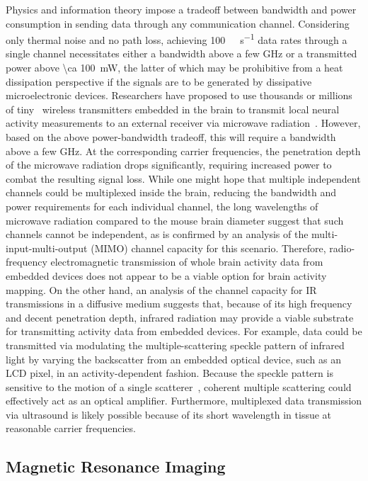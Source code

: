 Physics and information theory impose a tradeoff between bandwidth and power consumption in sending data through any communication channel.
Considering only thermal noise and no path loss, achieving \SI{100}{\giga\bit\per\second} data rates through a single channel necessitates either a bandwidth above a few \si{\giga\hertz} or a transmitted power above \SI{\ca 100}{\milli\watt}, the latter of which may be prohibitive from a heat dissipation perspective if the signals are to be generated by dissipative microelectronic devices.
Researchers have proposed to use thousands or millions of tiny~\cite{gomez10} wireless transmitters embedded in the brain to transmit local neural activity measurements to an external receiver via microwave radiation~\cite{dyson09}.
However, based on the above power-bandwidth tradeoff, this will require a bandwidth above a few \si{\giga\hertz}.
At the corresponding carrier frequencies, the penetration depth of the microwave radiation drops significantly, requiring increased power to combat the resulting signal loss.
While one might hope that multiple independent channels could be multiplexed inside the brain, reducing the bandwidth and power requirements for each individual channel, the long wavelengths of microwave radiation compared to the mouse brain diameter suggest that such channels cannot be independent, as is confirmed by an analysis of the multi-input-multi-output (MIMO) channel capacity for this scenario.
Therefore, radio-frequency electromagnetic transmission of whole brain activity data from embedded devices does not appear to be a viable option for brain activity mapping.
On the other hand, an analysis of the channel capacity for IR transmissions in a diffusive medium suggests that, because of its high frequency and decent penetration depth, infrared radiation may provide a viable substrate for transmitting activity data from embedded devices.
For example, data could be transmitted via modulating the multiple-scattering speckle pattern of infrared light by varying the backscatter from an embedded optical device, such as an LCD pixel, in an activity-dependent fashion.
Because the speckle pattern is sensitive to the motion of a single scatterer~\cite{berkovits91}, coherent multiple scattering could effectively act as an optical amplifier. Furthermore, multiplexed data transmission via ultrasound is likely possible because of its short wavelength in tissue at reasonable carrier frequencies.

\subsection{Magnetic Resonance Imaging}

